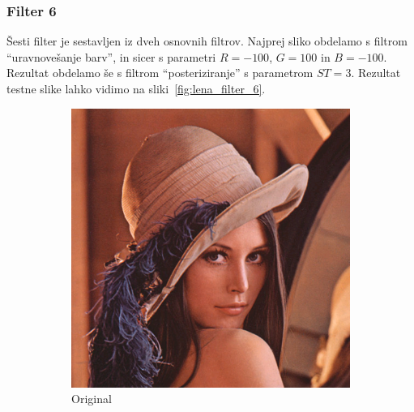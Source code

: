 \documentclass[a4paper, 12pt]{book}
\begin{document}
\subsubsection*{Filter 6}
Šesti filter je sestavljen iz dveh osnovnih filtrov. Najprej sliko obdelamo s
filtrom ``uravnovešanje barv'', in sicer s parametri $R = -100$, $G = 100$ in
$B = -100$. Rezultat obdelamo še s filtrom ``posteriziranje'' s parametrom
$ST = 3$. Rezultat testne slike lahko vidimo na sliki~\ref{fig:lena_filter_6}.

\begin{figure}[!ht]
    \centering
    \begin{subfigure}[b]{0.4\textwidth}
        \includegraphics[width=\textwidth]{lena}
        \caption{Original}
    \end{subfigure}
    \begin{subfigure}[b]{0.4\textwidth}

\end{subfigure}
\end{figure}
\end{document}
